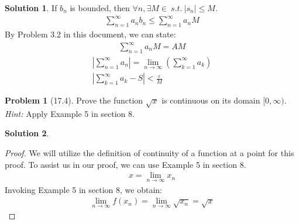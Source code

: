 \documentclass[12pt]{article}
\theoremstyle{definition} %
\newtheorem{solution}{Solution}
\newtheorem{problem}{Problem}
\theoremstyle{plain} %
\begin{document}
\begin{solution}
   If $b_{n}$ is bounded, then $\forall n, \exists M\in \ s.t. \ \left\vert s_{n} \right\vert\leq M $. 
   \begin{align}
      \sum_{n=1}^{\infty} a_{n}b_{n} \leq \sum_{n=1}^{\infty} a_{n}M
   \end{align}
   By Problem 3.2 in this document, we can state:
   \begin{align}
      \sum_{n=1}^{\infty} a_{n}M=AM
   \end{align}
   \begin{align}
      \left\vert \sum_{n=1}^{\infty} a_{n} \right\vert = \lim_{n \to \infty} \left( \sum_{k=1}^{\infty} a_{k} \right) \\[10pt] 
      \left\vert \sum_{k=1}^{\infty} a_{k}-S \right\vert <\frac{\varepsilon}{M}
   \end{align}

\end{solution}

\begin{problem}[17.4]
   Prove the function $\sqrt{x} $ is continuous on its domain $[0,\infty )$. \emph{Hint:} Apply Example 5 in section 8. 
\end{problem}
\begin{solution}
   \begin{proof}
      We will utilize the definition of continuity of a function at a point for this proof. To assist us in our proof, we can use Example 5 in section 8.
      \begin{align}   
      x=\lim_{n \to \infty} x_{n}
      \end{align}
      Invoking Example 5 in section 8, we obtain: 
      \begin{align}   
      \lim_{n \to \infty} f(x_{n}) = \lim_{n \to \infty} \sqrt{x_{n}} = \sqrt{x}  
      \end{align}
   \end{proof} 
\end{solution}
\end{document}
